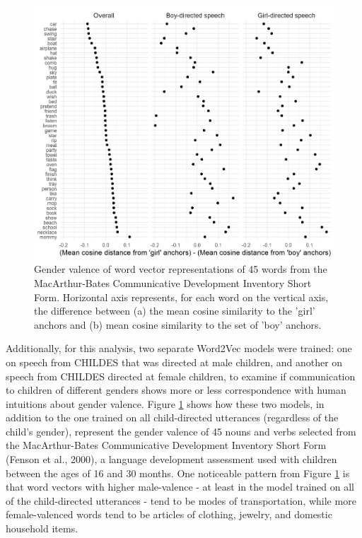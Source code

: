 \documentclass[10pt, letterpaper]{article}
\newenvironment{CodeChunk}{}{}
\begin{document}
\begin{CodeChunk}
\begin{figure}[h]

{\centering \includegraphics{figs/cdiplot-1} 

}

\caption[Gender valence of word vector representations of 45 words from the MacArthur-Bates Communicative Development Inventory Short Form]{Gender valence of word vector representations of 45 words from the MacArthur-Bates Communicative Development Inventory Short Form. Horizontal axis represents, for each word on the vertical axis, the difference between (a) the mean cosine similarity to the 'girl' anchors and (b) mean cosine similarity to the set of 'boy' anchors.}\label{fig:cdiplot}
\end{figure}
\end{CodeChunk}

Additionally, for this analysis, two separate Word2Vec models were
trained: one on speech from CHILDES that was directed at male children,
and another on speech from CHILDES directed at female children, to
examine if communication to children of different genders shows more or
less correspondence with human intuitions about gender valence. Figure
\ref{fig:cdiplot} shows how these two models, in addition to the one
trained on all child-directed utterances (regardless of the child's
gender), represent the gender valence of 45 nouns and verbs selected
from the MacArthur-Bates Communicative Development Inventory Short Form
(Fenson et al., 2000), a language development assessment used with
children between the ages of 16 and 30 months. One noticeable pattern
from Figure \ref{fig:cdiplot} is that word vectors with higher
male-valence - at least in the model trained on all of the
child-directed utterances - tend to be modes of transportation, while
more female-valenced words tend to be articles of clothing, jewelry, and
domestic household items.
\end{document}
